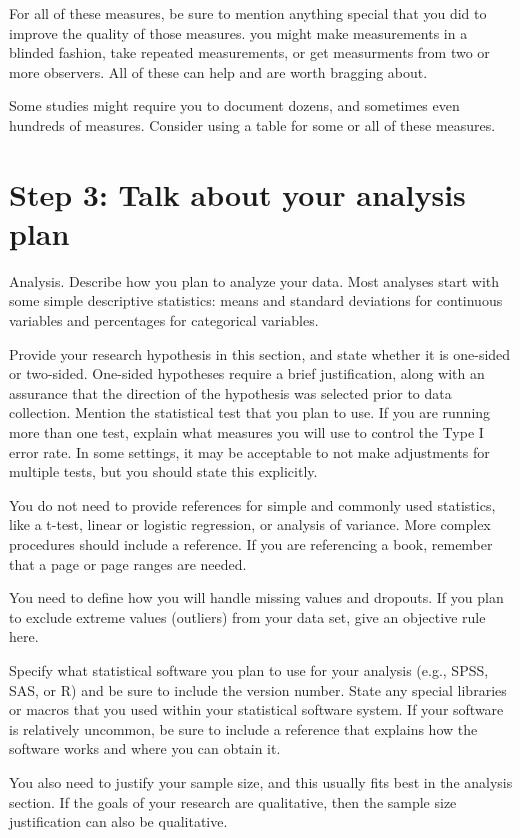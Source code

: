 \documentclass[
  letterpaper,
  DIV=11,
  numbers=noendperiod]{scrreprt}
\begin{document}
For all of these measures, be sure to mention anything special that you
did to improve the quality of those measures. you might make
measurements in a blinded fashion, take repeated measurements, or get
measurments from two or more observers. All of these can help and are
worth bragging about.

Some studies might require you to document dozens, and sometimes even
hundreds of measures. Consider using a table for some or all of these
measures.

\section{Step 3: Talk about your analysis
plan}\label{step-3-talk-about-your-analysis-plan}

Analysis. Describe how you plan to analyze your data. Most analyses
start with some simple descriptive statistics: means and standard
deviations for continuous variables and percentages for categorical
variables.

Provide your research hypothesis in this section, and state whether it
is one-sided or two-sided. One-sided hypotheses require a brief
justification, along with an assurance that the direction of the
hypothesis was selected prior to data collection. Mention the
statistical test that you plan to use. If you are running more than one
test, explain what measures you will use to control the Type I error
rate. In some settings, it may be acceptable to not make adjustments for
multiple tests, but you should state this explicitly.

You do not need to provide references for simple and commonly used
statistics, like a t-test, linear or logistic regression, or analysis of
variance. More complex procedures should include a reference. If you are
referencing a book, remember that a page or page ranges are needed.

You need to define how you will handle missing values and dropouts. If
you plan to exclude extreme values (outliers) from your data set, give
an objective rule here.

Specify what statistical software you plan to use for your analysis
(e.g., SPSS, SAS, or R) and be sure to include the version number. State
any special libraries or macros that you used within your statistical
software system. If your software is relatively uncommon, be sure to
include a reference that explains how the software works and where you
can obtain it.

You also need to justify your sample size, and this usually fits best in
the analysis section. If the goals of your research are qualitative,
then the sample size justification can also be qualitative.
\end{document}
